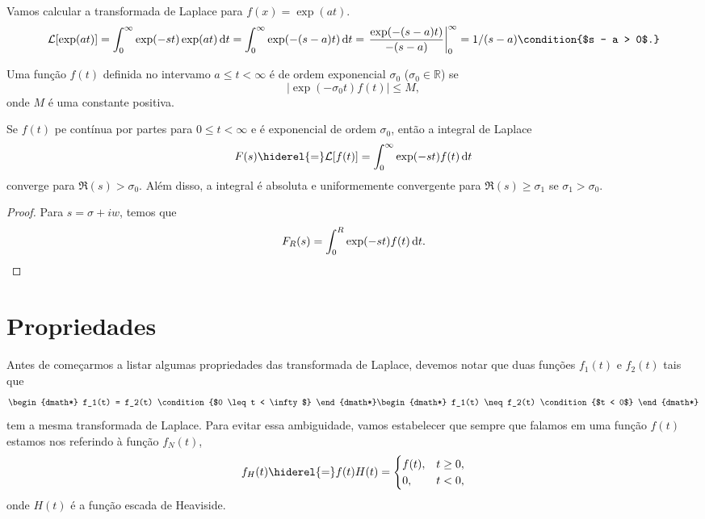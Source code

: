 \begin{exem}
  Vamos calcular a transformada de Laplace para $f(x) = \exp(a t)$.
  \begin{dmath*}
    \mathcal{L}[\exp(a t)] = \int_0^{\infty} \exp(-s t) \exp(a t) \vi{t}
    = \int_0^{\infty} \exp(- (s - a) t) \vi{t}
    = \left. \frac{\exp(- (s - a) t)}{- (s - a)} \right|_0^{\infty}
    = 1 / (s - a) \condition{$s - a > 0$.}
  \end{dmath*}
\end{exem}

\begin{defi}
  Uma função $f(t)$ definida no intervamo $a \leq t < \infty$ é de ordem
  exponencial $\sigma_0$ ($\sigma_0 \in \mathbb{R}$) se
  \begin{dmath*}
    | \exp(-\sigma_0 t) f(t) | \leq M,
  \end{dmath*}
  onde $M$ é uma constante positiva.
\end{defi}

\begin{teo}
  Se $f(t)$ pe contínua por partes para $0 \leq t < \infty$ e é exponencial de
  ordem $\sigma_0$, então a integral de Laplace
  \begin{dmath*}
    F(s) \hiderel{=} \mathcal{L}[f(t)] = \int_0^{\infty} \exp(-s t) f(t) \vi{t}
  \end{dmath*}
  converge para $\Re(s) > \sigma_0$. Além disso, a integral é absoluta e
  uniformemente convergente para $\Re(s) \geq \sigma_1$ se $\sigma_1 >
  \sigma_0$.
\end{teo}
\begin{proof}
  Para $s = \sigma + i w$, temos que
  \begin{dmath*}
    F_R(s) = \int_0^R \exp(-s t) f(t) \vi{t}.
  \end{dmath*}
\end{proof}

\section{Propriedades}
Antes de começarmos a listar algumas propriedades das transformada de Laplace,
devemos notar que duas funções $f_1(t)$ e $f_2(t)$ tais que
\begin{dgroup*}
  \begin{dmath*}
    f_1(t) = f_2(t) \condition{$0 \leq t < \infty$}
  \end{dmath*}
  \begin{dmath*}
    f_1(t) \neq f_2(t) \condition{$t < 0$}
  \end{dmath*}
\end{dgroup*}
tem a mesma transformada de Laplace. Para evitar essa ambiguidade, vamos
estabelecer que sempre que falamos em uma função $f(t)$ estamos nos referindo à
função $f_N(t)$,
\begin{dmath*}
  f_H(t) \hiderel{=} f(t) H(t) = \begin{cases}
    f(t), & t \geq 0, \\
    0, & t < 0,
  \end{cases}
\end{dmath*}
onde $H(t)$ é a função escada de Heaviside.

